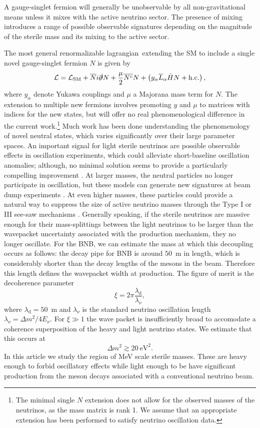 \documentclass[11pt, a4paper]{article}
\def\lagrangian{lagrangian}
\begin{document}
A gauge-singlet fermion will generally be unobservable by all non-gravitational
means unless it mixes with the active neutrino sector. The presence of mixing
introduces a range of possible observable signatures depending on the magnitude
of the sterile mass and its mixing to the active sector. 

The most general renormalizable \lagrangian\ extending the SM to include a
single novel gauge-singlet fermion $N$ is given by
%
\begin{align}   \mathcal{L} = \mathcal{L}_\text{SM} +
\overline{N}i\slashed{\partial}N+ \frac{\mu}{2} \overline{N^\text{c}}N  +
\left( y_\alpha\overline{L}_\alpha\tilde{H} N
+\text{h.c.}\right),\label{eq:minimallag} \end{align}
%
where $y_\alpha$ denote Yukawa couplings and $\mu$ a Majorana mass term for
$N$. The extension to multiple new fermions involves promoting $y$ and $\mu$ to
matrices with indices for the new states, but will offer no real
phenomenological difference in the current work.\footnote{The minimal single
$N$ extension does not allow for the observed masses of the neutrinos, as the
mass matrix is rank 1. We assume that an appropriate extension has been
performed to satisfy neutrino oscillation data.} Much work has been done
understanding the phenomenology of novel neutral states, which varies
significantly over their large parameter spaces. An important signal for light
sterile neutrinos are possible observable effects in oscillation experiments,
which could alleviate short-baseline oscillation anomalies; although, no
minimal solution seems to provide a particularly compelling improvement
\cite{Kopp:2013vaa}. At larger masses, the neutral particles no longer
participate in oscillation, but these models can generate new signatures at
beam dump experiments \cite{}. At even higher masses, these particles could
provide a natural way to suppress the size of active neutrino masses through
the Type I or III see-saw mechanisms \cite{Minkowski:1977sc, GellMann:1980vs,
Mohapatra:1979ia}. 
%
Generally speaking, if the sterile neutrinos are massive enough for their
mass-splittings between the light neutrinos to be larger than the wavepacket
uncertainty associated with the production mechanism, they no longer oscillate.
For the BNB, we can estimate the mass at which this decoupling occurs as
follows: the decay pipe for BNB is around $50$~m in length, which is
considerably shorter than the decay lengths of the mesons in the beam.
Therefore this length defines the wavepacket width at production. The figure of
merit is the decoherence parameter \cite{Akhmedov:2009rb,Hernandez:2011rs}
%
\[  \xi = 2\pi \frac{\lambda_\text{d}}{\lambda_\nu}, \]
%
where $\lambda_\text{d} = 50$~m and $\lambda_\nu$ is the standard neutrino
oscillation length $\lambda_\nu = \Delta m^2/4E_\nu$. For $\xi\gg1$ the wave
packet is insufficiently broad to accomodate a coherence superposition of the
heavy and light neutrino states. We estimate that this occurs at 
%
\[  \Delta m^2 \gtrsim 20~\text{eV}^2. \] 
%
In this article we study the region of MeV scale sterile masses. These are
heavy enough to forbid oscillatory effects while light enough to be have
significant production from the meson decays associated with a conventional
neutrino beam. 
\end{document}
